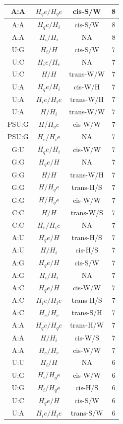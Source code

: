 \begin{center}
\begin{longtable}{c|c|c|c}
A:A & $H_qe/H_qe$ & cis-S/W & 8 \\  \hline
A:A & $H_qe/H_i$ & cis-S/W & 8 \\  \hline
A:A & $H_i/H_i$ & NA & 8 \\  \hline
U:G & $H_i/H$ & cis-S/W & 7 \\  \hline
U:C & $H_ie/H_e$ & NA & 7 \\  \hline
U:C & $H/H$ & trans-W/W & 7 \\  \hline
U:A & $H_qe/H_i$ & cis-W/H & 7 \\  \hline
U:A & $H_ie/H_ie$ & trans-W/H & 7 \\  \hline
U:A & $H/H_i$ & trans-W/W & 7 \\  \hline
PSU:G & $H/H_qe$ & cis-W/W & 7 \\  \hline
PSU:G & $H_e/H_ie$ & NA & 7 \\  \hline
G:U & $H_qe/H_i$ & cis-W/W & 7 \\  \hline
G:G & $H_qe/H$ & NA & 7 \\  \hline
G:G & $H/H$ & trans-W/H & 7 \\  \hline
G:G & $H/H_qe$ & trans-H/S & 7 \\  \hline
G:G & $H/H_qe$ & cis-W/W & 7 \\  \hline
C:C & $H/H$ & trans-W/S & 7 \\  \hline
C:C & $H_e/H_ie$ & NA & 7 \\  \hline
A:U & $H_qe/H$ & trans-H/S & 7 \\  \hline
A:U & $H/H_i$ & cis-H/S & 7 \\  \hline
A:G & $H_qe/H$ & cis-S/W & 7 \\  \hline
A:G & $H_i/H_i$ & NA & 7 \\  \hline
A:C & $H_qe/H$ & cis-W/W & 7 \\  \hline
A:C & $H_ie/H_ie$ & trans-H/S & 7 \\  \hline
A:C & $H_e/H_e$ & trans-S/H & 7 \\  \hline
A:A & $H_qe/H_qe$ & trans-H/W & 7 \\  \hline
A:A & $H/H_i$ & cis-W/S & 7 \\  \hline
A:A & $H_e/H_e$ & cis-W/W & 7 \\  \hline
U:U & $H_i/H$ & NA & 6 \\  \hline
U:G & $H_i/H_qe$ & cis-W/W & 6 \\  \hline
U:G & $H_i/H_qe$ & cis-H/S & 6 \\  \hline
U:C & $H_qe/H$ & cis-S/W & 6 \\  \hline
U:A & $H_ie/H_ie$ & trans-S/W & 6 \\  \hline

\end{longtable}
\end{center}
